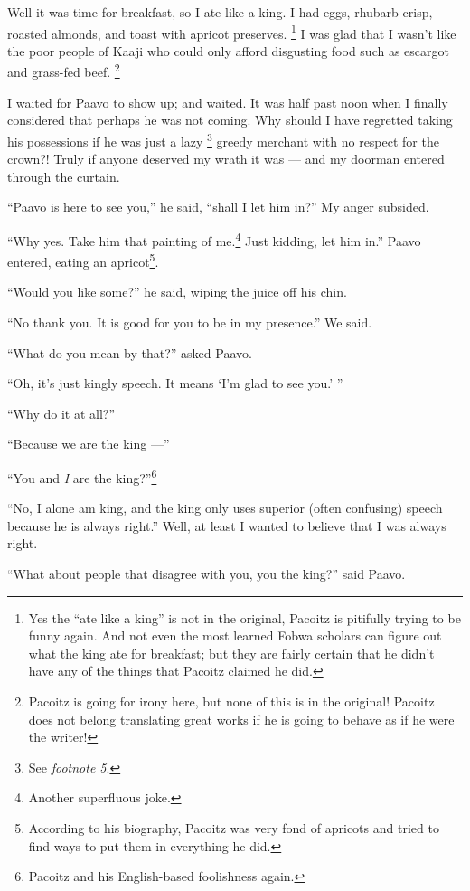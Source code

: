Well it was time for breakfast, so I ate like a king. I had eggs, rhubarb crisp, roasted almonds, and toast with apricot preserves. \footnote{Yes the ``ate like a king'' is not in the original, Pacoitz is pitifully trying to be funny again. And not even the most learned Fo\-bwa scholars can figure out what the king ate for breakfast; but they are fairly certain that he didn't have any of the things that Pacoitz claimed he did.}
I was glad that I wasn't like the poor people of Kaaji who could only afford disgusting food such as escargot and grass-fed beef. \footnote{Pacoitz is going for irony here, but none of this is in the original! Pacoitz does not belong translating great works if he is going to behave as if he were the writer!}

I waited for Paavo to show up; and waited.
It was half past noon when I finally considered that perhaps he was not coming.
Why should I have regretted taking his possessions if he was just a lazy
\footnote{See \emph{footnote 5}.} greedy merchant with no respect for the crown?!
Truly if anyone deserved my wrath it was --- and my doorman entered through the curtain.

``Paavo is here to see you,'' he said, ``shall I let him in?'' My anger subsided.

``Why yes. Take him that painting of me.\footnote{Another superfluous joke.} Just kidding, let him in.'' Paavo entered, eating an apricot\footnote{According to his biography, Pacoitz was very fond of apricots and tried to find ways to put them in everything he did.}.

``Would you like some?'' he said, wiping the juice off his chin.

``No thank you. It is good for you to be in my presence.'' We said.

``What do you mean by that?'' asked Paavo.

``Oh, it's just kingly speech. It means `I'm glad to see you.' ''

``Why do it at all?''

``Because we are the king ---''

``You and \emph{I} are the king?''\footnote{Pacoitz and his English-based foolishness again.}

``No, I alone am king, and the king only uses superior (often confusing) speech because he is always right.'' Well, at least I wanted to believe that I was always right.

``What about people that disagree with you, you the king?'' said Paavo.

